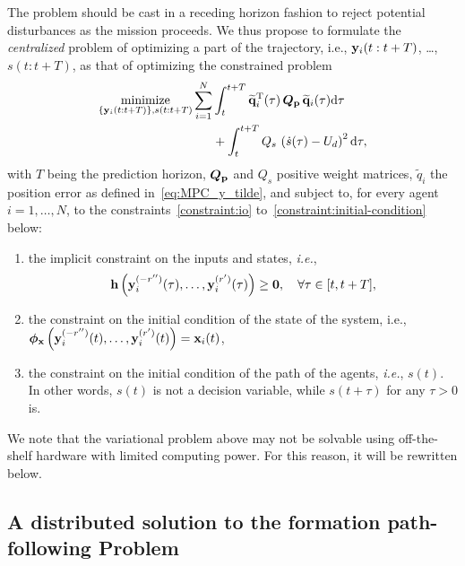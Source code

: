 The problem should be cast in a receding horizon fashion to reject potential disturbances as the mission proceeds.     
We thus propose to formulate the \emph{centralized} problem of optimizing a part of the trajectory, i.e., $\mathbf{y}_i(t:t+T)$, \ldots, $s(t:t+T)$, as that of optimizing the constrained problem
%
\begin{equation}
    \begin{split}
        \operatorname*{minimize}_{ \left\lbrace \mathbf{y}_i(t:t+T) \right\rbrace, s(t:t+T)}
        \sum_{i=1}^N
        &
        \int_{t}^{t+T}
        \widetilde{\mathbf{q}}_i^{\mathrm{T}}(\tau) \, \bm{Q}_{\mathbf{p}} \, \widetilde{\mathbf{q}}_i(\tau) {\rm d}\tau \\
        & 
        +
        \int_{t}^{t+T} Q_s\,\left(\dot{s}(\tau) - U_d\right)^2 {\rm d}\tau, 
    \end{split}
\label{eq:MPC_optimization_centralized}
\end{equation}
with $T$ being the prediction horizon, $\bm{Q}_{\mathbf{p}}$ and $Q_s$ positive weight matrices, $\widetilde{q}_{i}$ the position error as defined in~\eqref{eq:MPC_y_tilde}, and subject to, for every agent $i = 1, \ldots, N$, to the constraints~\ref{constraint:io} to~\ref{constraint:initial-condition} below:
\begin{enumerate}[label=C\arabic*]
    \item the implicit constraint on the inputs and states, \emph{i.e.}, $$\mathbf{h} \left( \mathbf{y}_i^{(-r'')}(\tau), \ldots, \mathbf{y}^{(r')}_i(\tau) \right) \geq \bm{0}, \quad \forall \tau \in [t, t + T],$$
    \label{constraint:io}
    \item the constraint on the initial condition of the state of the system, i.e., $\bm{\phi}_{\mathbf{x}} \left(\mathbf{y}_i^{(-r'')}(t), \ldots, \mathbf{y}^{(r')}_i(t)\right) = \mathbf{x}_{i}(t)$,
    \item the constraint on the initial condition of the path of the agents, \emph{i.e.}, $s(t)$. In other words, $s(t)$ is not a decision variable, while $s(t+\tau)$ for any $\tau > 0$ is.
    \label{constraint:initial-condition}
\end{enumerate}
We note that the variational problem above may not be solvable using off-the-shelf hardware with limited computing power. For this reason, it will be rewritten below.



\subsection{A distributed solution to the formation path-following Problem}



